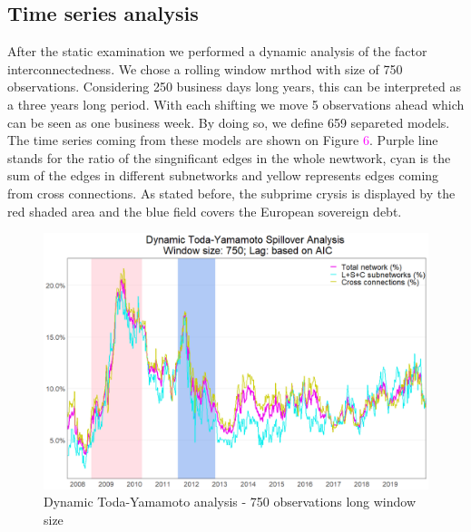 \documentclass[12pt,bibliography=totoc]{article}
\begin{document}

\subsection{Time series analysis}


After the static examination we performed a dynamic analysis of the factor interconnectedness. We chose a rolling window mrthod with size of 750 observations. Considering 250 business days long years, this can be interpreted as a three years long period. With each shifting we move 5 observations ahead which can be seen as one business week. By doing so, we define 659 separeted models. The time series coming from these models are shown on Figure \textcolor{magenta}{6}. Purple line stands for the ratio of the singnificant edges in the whole newtwork, cyan is the sum of the edges in different subnetworks and yellow represents edges coming from cross connections. As stated before, the subprime crysis is displayed by the red shaded area and the blue field covers the European sovereign debt.


\begin{figure}[H]
\includegraphics[width=11.5cm]{Time_series_750}
\centering
\caption{Dynamic Toda-Yamamoto analysis -  750 observations long window size}
\end{figure}
\end{document}
